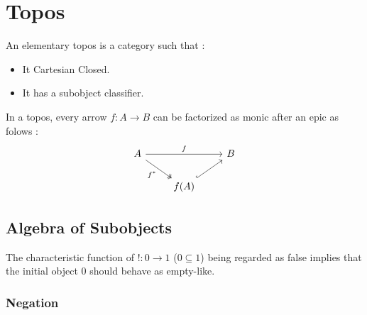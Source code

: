 \section{Topos}

\begin{definition}[Topos]

  An elementary topos is a category such that
  \parencite[p.~84]{goldblatt:topoi}:

  \begin{itemize}
    \item It Cartesian Closed.
    \item It has a subobject classifier.
  \end{itemize}
\end{definition}

\begin{proposition}\label{prop:epicmono_factorization}
  In a topos, every arrow $f:A\to B$ can be factorized as monic after an epic as
  folows \parencite[p.~110]{goldblatt:topoi}:
  \[\begin{tikzcd}[ampersand replacement=\&]
    A \&\& B \\
    \& {f(A)}
    \arrow["f", from=1-1, to=1-3]
    \arrow["{f^*}"', two heads, from=1-1, to=2-2]
    \arrow[hook, from=2-2, to=1-3]
  \end{tikzcd}\]
\end{proposition}

\subsection{Algebra of Subobjects}

\begin{remark}
  The characteristic function of $!:0\to 1$ ($0 \subseteq 1$) being regarded as
  false implies that the initial object $0$ should behave as empty-like.
\end{remark}

\subsubsection{Negation}

